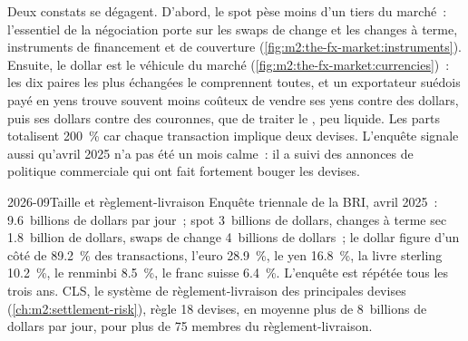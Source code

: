 Deux constats se dégagent. D'abord, le spot pèse moins d'un tiers du marché~: l'essentiel
de la négociation porte sur les swaps de change et les changes à terme, instruments de financement et de couverture
(\cref{fig:m2:the-fx-market:instruments}). Ensuite, le dollar est le
véhicule du marché (\cref{fig:m2:the-fx-market:currencies})~: les dix paires les plus
échangées le comprennent toutes, et un exportateur suédois payé en yens trouve souvent
moins coûteux de vendre ses yens contre des dollars, puis ses dollars contre des couronnes, que de traiter le
, peu liquide.
Les parts totalisent 200~\% car chaque transaction implique deux devises. L'enquête
signale aussi qu'avril 2025 n'a pas été un mois calme~: il a suivi des annonces de politique
commerciale qui ont fait fortement bouger les devises.

\begin{omfigure}

\label{fig:m2:the-fx-market:currencies}
\end{omfigure}

\begin{dated}{2026-09}{Taille et règlement-livraison}\label{dat:m2:the-fx-market:survey}
Enquête triennale de la BRI, avril 2025~: 9.6~billions de dollars par jour~; spot 3~billions de dollars,
changes à terme sec 1.8~billion de dollars, swaps de change 4~billions de dollars~; le dollar figure d'un côté
de 89.2~\% des transactions, l'euro 28.9~\%, le yen 16.8~\%, la livre sterling 10.2~\%, le renminbi 8.5~\%,
le franc suisse 6.4~\%. L'enquête est répétée tous les trois ans. CLS, le système de règlement-livraison
des principales devises (\cref{ch:m2:settlement-risk}), règle 18
devises, en moyenne plus de 8~billions de dollars par jour, pour plus de 75
membres du règlement-livraison.
\end{dated}

